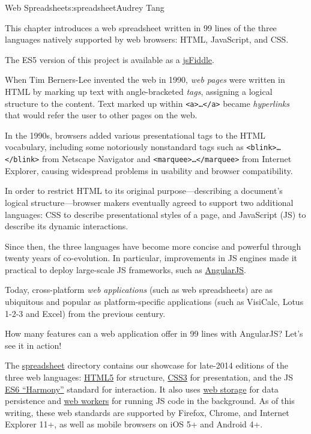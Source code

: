\begin{aosachapter}{Web Spreadsheet}{s:spreadsheet}{Audrey Tang}

This chapter introduces a web spreadsheet written in 99 lines of the
three languages natively supported by web browsers: HTML, JavaScript,
and CSS.

The ES5 version of this project is available as a
\href{http://jsfiddle.net/audreyt/LtDyP/}{jsFiddle}.

\label{introduction}

When Tim Berners-Lee invented the web in 1990, \emph{web pages} were
written in HTML by marking up text with angle-bracketed \emph{tags},
assigning a logical structure to the content. Text marked up within
\texttt{\textless{}a\textgreater{}\ldots{}\textless{}/a\textgreater{}}
became \emph{hyperlinks} that would refer the user to other pages on the
web.

In the 1990s, browsers added various presentational tags to the HTML
vocabulary, including some notoriously nonstandard tags such as
\texttt{\textless{}blink\textgreater{}\ldots{}\textless{}/blink\textgreater{}}
from Netscape Navigator and
\texttt{\textless{}marquee\textgreater{}\ldots{}\textless{}/marquee\textgreater{}}
from Internet Explorer, causing widespread problems in usability and
browser compatibility.

In order to restrict HTML to its original purpose---describing a
document's logical structure---browser makers eventually agreed to
support two additional languages: CSS to describe presentational styles
of a page, and JavaScript (JS) to describe its dynamic interactions.

Since then, the three languages have become more concise and powerful
through twenty years of co-evolution. In particular, improvements in JS
engines made it practical to deploy large-scale JS frameworks, such as
\href{http://angularjs.org/}{AngularJS}.

Today, cross-platform \emph{web applications} (such as web spreadsheets)
are as ubiquitous and popular as platform-specific applications (such as
VisiCalc, Lotus 1-2-3 and Excel) from the previous century.

How many features can a web application offer in 99 lines with
AngularJS? Let's see it in action!

\label{overview}

The
\href{https://github.com/audreyt/500lines/tree/master/spreadsheet/code}{spreadsheet}
directory contains our showcase for late-2014 editions of the three web
languages: \href{http://www.w3.org/TR/html5/}{HTML5} for structure,
\href{http://www.w3.org/TR/css3-ui/}{CSS3} for presentation, and the JS
\href{http://git.io/es6features}{ES6 ``Harmony''} standard for
interaction. It also uses
\href{http://www.whatwg.org/specs/web-apps/current-work/multipage/webstorage.html}{web
storage} for data persistence and
\href{http://www.whatwg.org/specs/web-apps/current-work/multipage/workers.html}{web
workers} for running JS code in the background. As of this writing,
these web standards are supported by Firefox, Chrome, and Internet
Explorer 11+, as well as mobile browsers on iOS 5+ and Android 4+.


\end{aosachapter}
